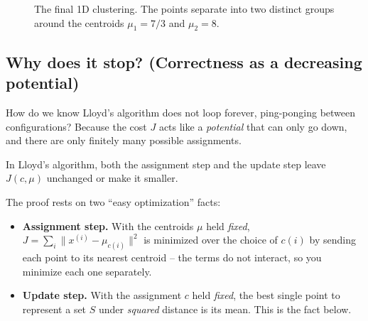 \begin{figure}[htbp]
\centering
{}
\caption{The final 1D clustering. The points separate into two distinct groups around the centroids $\mu_1 = 7/3$ and $\mu_2 = 8$.}
\label{ch36:fig-kmeans-1d}
\end{figure}

\subsection{Why does it stop? (Correctness as a decreasing potential)}

How do we know Lloyd's algorithm does not loop forever, ping-ponging between
configurations? Because the cost $J$ acts like a \emph{potential} that can only
go down, and there are only finitely many possible assignments.

\begin{lemma}
\label{ch36:lemma-monotone}
In Lloyd's algorithm, both the assignment step and the update step leave
$J(c,\mu)$ unchanged or make it smaller.
\end{lemma}

\begin{focusbox}
The proof rests on two ``easy optimization'' facts:
\begin{itemize}
  \item \textbf{Assignment step.} With the centroids $\mu$ held \emph{fixed},
        $J = \sum_i \lVert x^{(i)} - \mu_{c(i)}\rVert^2$ is minimized over the
        choice of $c(i)$ by sending each point to its nearest centroid -- the
        terms do not interact, so you minimize each one separately.
  \item \textbf{Update step.} With the assignment $c$ held \emph{fixed}, the
        best single point to represent a set $S$ under \emph{squared} distance
        is its mean. This is the fact below.
\end{itemize}
\end{focusbox}

